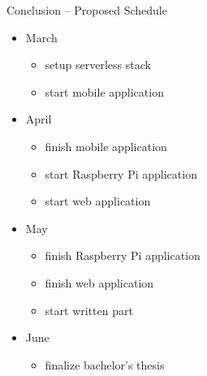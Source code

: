 \documentclass[aspectratio=169]{beamer}
\begin{document}
  
  
  
  

  \begin{frame}{Conclusion -- Proposed Schedule}
    \begin{itemize}
      \item March
        \begin{itemize}
          \item setup serverless stack
          \item start mobile application
        \end{itemize}
      \item April
        \begin{itemize}
          \item finish mobile application
          \item start Raspberry Pi application
          \item start web application
        \end{itemize}
      \item May
        \begin{itemize}
          \item finish Raspberry Pi application
          \item finish web application
          \item start written part
        \end{itemize}
      \item June
        \begin{itemize}
          \item finalize bachelor’s thesis
        \end{itemize}
    \end{itemize}
  \end{frame}
\end{document}
